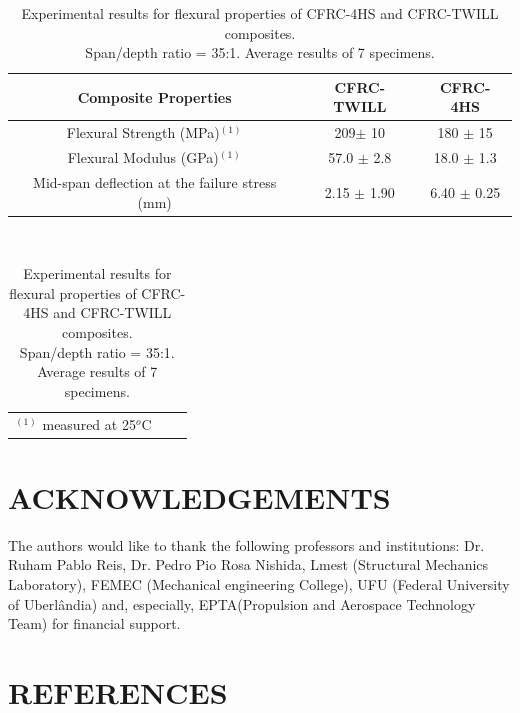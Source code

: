 \documentclass[10pt,fleqn,a4paper,twoside]{article}
\begin{document}
\begin{table}[!h]
\centering
\caption{Experimental results for flexural properties of CFRC-4HS and CFRC-TWILL composites. \protect\\Span/depth ratio = 35:1. Average results of 7 specimens.}
\begin{tabular}{|c|c|c|}
\hline
Composite Properties & CFRC-TWILL & CFRC-4HS\\
\hline
Flexural Strength (MPa)$^{(1)}$ & 209$\pm$ 10 & 180 $\pm$  15\\
\hline
Flexural Modulus (GPa)$^{(1)}$ & 57.0 $\pm$ 2.8 & 18.0 $\pm$  1.3\\
\hline
Mid-span deflection at the failure stress (mm) & 2.15 $\pm$  1.90 & 6.40 $\pm$  0.25\\
\hline
\end{tabular}
\\
\begin{tabular}{p{11cm}ll}
$^{(1)}$ measured at 25$^{o}$C & &
\end{tabular}
\label{tab1}
\end{table}



\section{ACKNOWLEDGEMENTS}
The authors would like to thank the following professors and institutions: Dr. Ruham Pablo Reis, Dr. Pedro Pio Rosa Nishida, Lmest (Structural Mechanics Laboratory), FEMEC (Mechanical engineering College), UFU (Federal University of Uberl\^andia) and, especially, EPTA(Propulsion and Aerospace Technology Team) for financial support.




\section{REFERENCES} 


\renewcommand{\refname}{}

\end{document}
